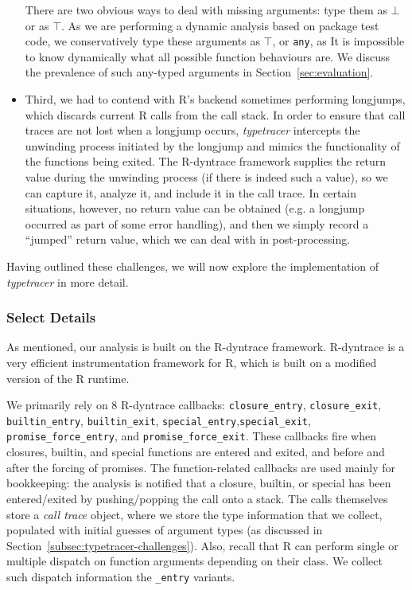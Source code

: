 \documentclass[acmsmall,review,anonymous]{acmart}\settopmatter{printfolios=true,printccs=false,printacmref=false}
\newcommand{\code}[1]{{\lstinline[style=Rin]!#1!}\xspace}
\newcommand{\typetracer}{\emph{typetracer}\xspace} %
\begin{document}
\begin{itemize}
There are two obvious ways to deal with missing arguments: type them as $\bot$
or as $\top$.  As we are performing a dynamic analysis based on package test
code, we conservatively type these arguments as $\top$, or \code{any}, as It is
impossible to know dynamically what all possible function behaviours are.
We discuss the prevalence of such any-typed arguments in
Section~\ref{sec:evaluation}.

\item Third, we had to contend with R's backend sometimes
  performing longjumps, which discards current R calls from the call stack.
  In order to ensure that call traces are not lost when a longjump occurs,
  \typetracer intercepts the unwinding process initiated by the longjump and
  mimics the functionality of the functions being exited.  The R-dyntrace
  framework supplies the return value during the unwinding process (if there
  is indeed such a value), so we can capture it, analyze it, and include it
  in the call trace.  In certain situations, however, no return value can be
  obtained (e.g. a longjump occurred as part of some error handling), and
  then we simply record a ``jumped'' return value, which we can deal with in
  post-processing.  
\end{itemize}

Having outlined these challenges, we will now explore the implementation of \typetracer in more detail.

%
%
\subsubsection{Select Details}

As mentioned, our analysis is built on the R-dyntrace framework.  R-dyntrace
is a very efficient instrumentation framework for R, which is built on a
modified version of the R runtime. 

We primarily rely on 8 R-dyntrace callbacks: \texttt{closure\_entry},
\texttt{closure\_exit}, \texttt{builtin\_entry}, \texttt{builtin\_exit},
\texttt{special\_entry},\texttt{special\_exit},
\texttt{promise\_force\_entry}, and \texttt{promise\_force\_exit}.  These
callbacks fire when closures, builtin, and special functions are entered and
exited, and before and after the forcing of promises.  The function-related
callbacks are used mainly for bookkeeping: the analysis is notified that a
closure, builtin, or special has been entered/exited by pushing/popping the
call onto a stack.  The calls themselves store a {\it call trace} object,
where we store the type information that we collect, populated with initial
guesses of argument types (as discussed in
Section~\ref{subsec:typetracer-challenges}).  Also, recall that R can
perform single or multiple dispatch on function arguments depending on their
class.  We collect such dispatch information the {\tt \_entry} variants.
\end{document}
